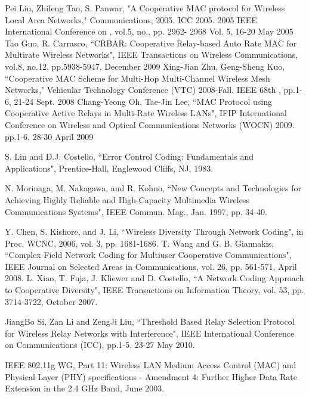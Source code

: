 \documentclass[conference]{IEEEtran}
\begin{document}
\begin{thebibliography}{1}
Pei Liu, Zhifeng Tao, S. Panwar, "A Cooperative MAC protocol for Wireless Local Area Networks," Communications, 2005. ICC 2005. 2005 IEEE International Conference on , vol.5, no., pp. 2962- 2968 Vol. 5, 16-20 May 2005
Tao Guo, R. Carrasco, ``CRBAR: Cooperative Relay-based Auto Rate MAC for Multirate Wireless Networks", IEEE Transactions on Wireless Communications, vol.8, no.12, pp.5938-5947, December 2009
Xing-Jian Zhu, Geng-Sheng Kuo, ``Cooperative MAC Scheme for Multi-Hop Multi-Channel Wireless Mesh Networks," Vehicular Technology Conference (VTC) 2008-Fall. IEEE 68th , pp.1-6, 21-24 Sept. 2008
Chang-Yeong Oh, Tae-Jin Lee, ``MAC Protocol using Cooperative Active Relays in Multi-Rate Wireless LANs", IFIP International Conference on Wireless and Optical Communications Networks (WOCN) 2009. pp.1-6, 28-30 April 2009

S. Lin and D.J. Costello, ``Error Control Coding: Fundamentals and Applications", Prentice-Hall, Englewood Cliffs, NJ, 1983.

N. Morinaga, M. Nakagawa, and R. Kohno, ``New Concepts and Technologies for Achieving Highly Reliable and High-Capacity Multimedia Wireless Communications Systems", IEEE Commun. Mag., Jan. 1997, pp. 34-40.

Y. Chen, S. Kishore, and J. Li, ``Wireless Diversity Through Network Coding", in Proc. WCNC, 2006, vol. 3, pp. 1681-1686.
T. Wang and G. B. Giannakis, ``Complex Field Network Coding for Multiuser Cooperative Communications", IEEE Journal on Selected Areas in Communications, vol. 26, pp. 561-571, April 2008.
L. Xiao, T. Fuja, J. Kliewer and D. Costello, ``A Network Coding Approach to Cooperative Diversity", IEEE Transactions on Information Theory, vol. 53, pp. 3714-3722, October 2007.

JiangBo Si, Zan Li and ZengJi Liu, ``Threshold Based Relay Selection Protocol for Wireless Relay Networks with Interference", IEEE International Conference on Communications (ICC), pp.1-5, 23-27 May 2010.

IEEE 802.11g WG, Part 11: Wireless LAN Medium Access Control (MAC) and Physical Layer (PHY) specifications - Amendment 4: Further Higher Data Rate Extension in the 2.4 GHz Band, June 2003.


\end{thebibliography}
\end{document}
